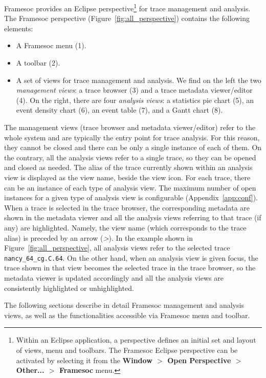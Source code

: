 \documentclass[twoside]{article}
\begin{document}
\begin{sloppypar}
Framesoc provides an Eclipse perspective\footnote{Within an Eclipse application, a perspective defines an initial set and layout of views, menu and toolbars. The Framesoc Eclipse perspective can be activated by selecting it from the \textbf{Window $>$ Open Perspective $>$ Other... $>$ Framesoc} menu.} for trace management and analysis.
The Framesoc perspective (Figure~\ref{fig:all_perspective}) contains the following elements:
\begin{itemize}
 \item A Framesoc menu (\num{1}).
 \item A toolbar (\num{2}).
 \item A set of views for trace management and analysis. We find on the left the two \emph{management views}: a trace browser (\num{3}) and a trace metadata viewer/editor (\num{4}). On the right, there are four \emph{analysis views}: a statistics pie chart (\num{5}), an event density chart (\num{6}), an event table (\num{7}), and a Gantt chart (\num{8}). 
\end{itemize}

The management views (trace browser and metadata viewer/editor) refer to the whole system and are typically the entry point for trace analysis.
For this reason, they cannot be closed and there can be only a single instance of each of them.
On the contrary, all the analysis views refer to a single trace, so they can be opened and closed as needed. 
The alias of the trace currently shown within an analysis view is displayed as the view name, beside the view icon.
For each trace, there can be an instance of each type of analysis view. 
The maximum number of open instances for a given type of analysis view is configurable (Appendix~\ref{app:conf}).
When a trace is selected in the trace browser, the corresponding metadata are shown in the metadata viewer and all the analysis views referring to that trace (if any) are highlighted. 
Namely, the view name (which corresponds to the trace alias) is preceded by an arrow (\emph{>}). 
In the example shown in Figure~\ref{fig:all_perspective}, all analysis views refer to the selected trace \texttt{nancy\_64\_cg.C.64}.
On the other hand, when an analysis view is given focus, the trace shown in that view becomes the selected trace in the trace browser, so the metadata viewer is updated accordingly and all the analysis views are consistently highlighted or unhighlighted. 

The following sections describe in detail Framesoc management and analysis views, as well as the functionalities accessible via Framesoc menu and toolbar.


\end{sloppypar}
\end{document}
